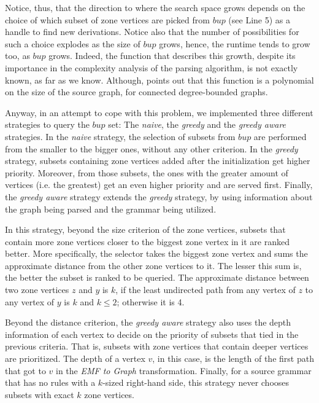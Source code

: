 Notice, thus, that the direction to where the search space grows depends on the choice of which subset of zone vertices are picked from $bup$ (see Line 5) as a handle to find new derivations. Notice also that the number of possibilities for such a choice explodes as the size of $bup$ grows, hence, the runtime tends to grow too, as $bup$ grows. Indeed, the function that describes this growth, despite its importance in the complexity analysis of the parsing algorithm, is not exactly known, as far as we know. Although, \cite[p. 160]{rozenberg1986boundary} points out that this function is a polynomial on the size of the source graph, for connected degree-bounded graphs.

Anyway, in an attempt to cope with this problem, we implemented three different strategies to query the $bup$ set: The \emph{naive}, the \emph{greedy} and the \emph{greedy aware} strategies. In the \emph{naive} strategy, the selection of subsets from $bup$ are performed from the smaller to the bigger ones, without any other criterion. In the \emph{greedy} strategy, subsets containing zone vertices added after the initialization get higher priority. Moreover, from those subsets, the ones with the greater amount of vertices (i.e. the greatest) get an even higher priority and are served first. Finally, the \emph{greedy aware} strategy extends the \emph{greedy} strategy, by using information about the graph being parsed and the grammar being utilized.

In this strategy, beyond the size criterion of the zone vertices, subsets that contain more zone vertices closer to the biggest zone vertex in it are ranked better. More specifically, the selector takes the biggest zone vertex and sums the approximate distance from the other zone vertices to it. The lesser this sum is, the better the subset is ranked to be queried. The approximate distance between two zone vertices $z$ and $y$ is $k$, if the least undirected path from any vertex of $z$ to any vertex of $y$ is $k$ and $k \leq 2$; otherwise it is 4.

Beyond the distance criterion, the \emph{greedy aware} strategy also uses the depth information of each vertex to decide on the priority of subsets that tied in the previous criteria. That is, subsets with zone vertices that contain deeper vertices are prioritized. The depth of a vertex $v$, in this case, is the length of the first path that got to $v$ in the \emph{EMF to Graph} transformation. Finally, for a source grammar that has no rules with a $k$-sized right-hand side, this strategy never chooses subsets with exact $k$ zone vertices.

